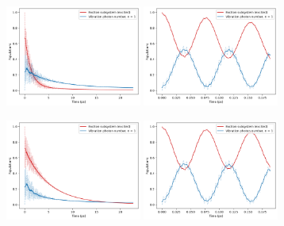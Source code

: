 \documentclass[11pt]{article}
\begin{document}
\begin{figure}[H]
    \centering

    \begin{subfigure}{\textwidth}
        \centering
        \includegraphics[width=0.49\textwidth]{Research Project/Code/results/ExVib/Open/Population/Envelope/pops_ex_spont_e0.png}
        \hfill
        \includegraphics[width=0.49\textwidth]{Research Project/Code/results/ExVib/Open/Population/Fast/pops_ex_spont_e0.png}
        \caption{}
        \label{fig:EVM_OQS_Pop_spont_e0}
    \end{subfigure}

    \vspace{0.8em}

    \begin{subfigure}{\textwidth}
        \centering
        \includegraphics[width=0.49\textwidth]{Research Project/Code/results/ExVib/Open/Population/Envelope/pops_ex_therm_e0.png}
        \hfill
        \includegraphics[width=0.49\textwidth]{Research Project/Code/results/ExVib/Open/Population/Fast/pops_ex_therm_e0.png}
        \caption{}
        \label{fig:EVM_OQS_Pop_therm_e0}
    \end{subfigure}


\end{figure}
\end{document}
